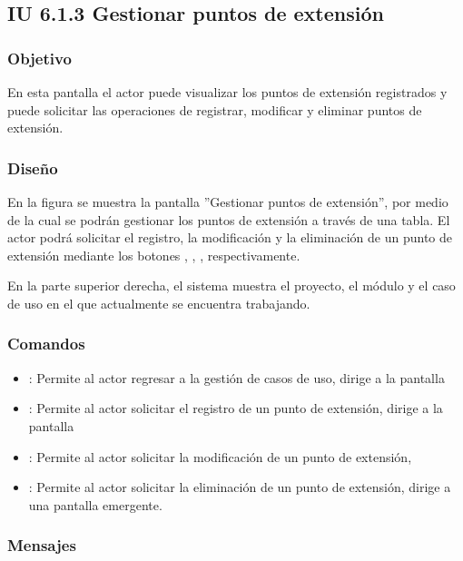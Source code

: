 \subsection{IU 6.1.3 Gestionar puntos de extensión}

\subsubsection{Objetivo}
	En esta pantalla el actor puede visualizar los puntos de extensión registrados y puede solicitar las operaciones de registrar, modificar y eliminar puntos de extensión.
\subsubsection{Diseño}
	En la figura  se muestra la pantalla ''Gestionar puntos de extensión'', por medio de la cual se podrán gestionar los puntos de extensión a través de una tabla. El actor podrá solicitar el registro, la modificación y la eliminación de un punto de extensión mediante los botones , \editar, \eliminar, respectivamente.
	
	En la parte superior derecha, el sistema muestra el proyecto, el módulo y el caso de uso en el que actualmente se encuentra trabajando.

\subsubsection{Comandos}
\begin{itemize}
	\item {}: Permite al actor regresar a la gestión de casos de uso, dirige a la pantalla 
	\item {}: Permite al actor solicitar el registro de un punto de extensión, dirige a la pantalla 
	\item \editar [Modificar]: Permite al actor solicitar la modificación de un punto de extensión, 
	\item \eliminar [Eliminar]: Permite al actor solicitar la eliminación de un punto de extensión, dirige a una pantalla emergente.
\end{itemize}

\subsubsection{Mensajes}

